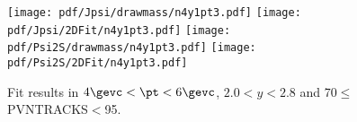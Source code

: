 \begin{figure}[H]
\begin{center}
\texttt{[image: pdf/Jpsi/drawmass/n4y1pt3.pdf]}
\texttt{[image: pdf/Jpsi/2DFit/n4y1pt3.pdf]}
\vspace*{-0.5cm}
\texttt{[image: pdf/Psi2S/drawmass/n4y1pt3.pdf]}
\texttt{[image: pdf/Psi2S/2DFit/n4y1pt3.pdf]}
\vspace*{-0.5cm}
\end{center}
\caption{Fit results in $4\gevc<\pt<6\gevc$, $2.0<y<2.8$ and 70$\leq$PVNTRACKS$<$95.}
\label{Fitn4y1pt3}
\end{figure}
